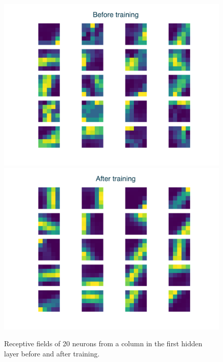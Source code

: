 \documentclass[12pt]{article}
\begin{document}
\begin{figure}[!htbp]
	\centering
	\includegraphics[width=12cm]{k5s2c1d1_c20 machine before}
	\includegraphics[width=12cm]{k5s2c1d1_c20 machine after}
	\caption{Receptive fields of 20 neurons from a column in the first hidden layer before and after training.}
	\label{fig:layer1}
\end{figure} 
\end{document}
